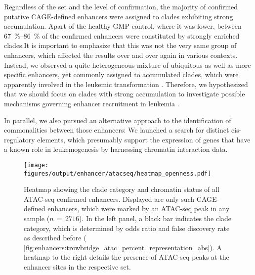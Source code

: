 Regardless of the set and the level of confirmation, the majority of confirmed putative CAGE-defined enhancers were assigned to clades exhibiting strong accumulation. Apart of the healthy GMP control, where it was lower, between \SIrange{67}{86}{\percent} of the confirmed enhancers were constituted by strongly enriched clades.It is important to emphasize that this was not the very same group of enhancers, which affected the results over and over again in various contexts. Instead, we observed a quite heterogeneous mixture of ubiquitous as well as more specific enhancers, yet commonly assigned to accumulated clades, which were apparently involved in the leukemic transformation . Therefore, we hypothesized that we should focus on clades with strong accumulation to investigate possible mechanisms governing enhancer recruitment in \mllafnine leukemia . 

In parallel, we also pursued an alternative approach to the identification of commonalities between those enhancers: We launched a search for distinct cis-regulatory elements, which presumably support the expression of genes that have a known role in \mllafnine leukemogenesis by harnessing chromatin interaction data. 

\begin{figure}[!p]
	\centering
	\texttt{[image: figures/output/enhancer/atacseq/heatmap\_openness.pdf]} 
	\caption{Heatmap showing the clade category and chromatin status of all ATAC-seq confirmed enhancers. Displayed are only such CAGE-defined enhancers, which were marked by an ATAC-seq peak in any sample ($n\,=\,2716$). In the left panel, a black bar indicates the clade category, which is determined by odds ratio and false discovery rate as described before ( 	\autoref{fig:enhancers:trowbridge_atac_percent_representation_abs}). A heatmap to the right details the presence of ATAC-seq peaks at the enhancer sites in the respective set.}
	\label{fig:enhancers:heatmap_openness}
\end{figure}

\label{chap:r:enhancers:trowbridgeend} 